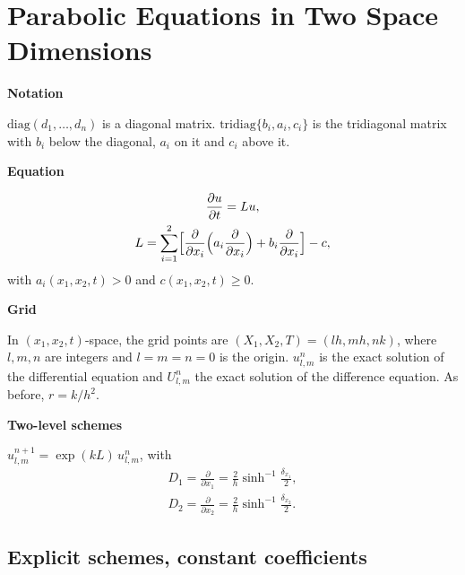 \documentclass[11pt,a4paper]{article}
\numberwithin{equation}{section}
\theoremstyle{spacedplain}
\theoremstyle{spaceddefinition}
\theoremstyle{spacedremark}
\newcommand{\step}[1]{\par\addvspace{0.6em}\noindent\textbf{#1}\par\nobreak}
\newcommand{\pd}[2]{\frac{\partial #1}{\partial #2}}
\begin{document}
\section{Parabolic Equations in Two Space Dimensions}

\step{Notation}
\(\mathrm{diag}(d_1,\dots,d_n)\) is a diagonal
matrix.  \(\mathrm{tridiag}\{b_i,a_i,c_i\}\) is the tridiagonal matrix
with \(b_i\) below the diagonal, \(a_i\) on it and \(c_i\) above it.

\step{Equation}

\[
\begin{gathered}
  \pd ut=Lu,
  \\
  L=\sum_{i=1}^2\Bigl[\pd{}{x_i}\Bigl(a_i\pd{}{x_i}\Bigr)+b_i\pd{}{x_i}\Bigr]-c,
\end{gathered}
\]
with \(a_i(x_1,x_2,t)>0\) and \(c(x_1,x_2,t)\ge0\).

\step{Grid}
In \((x_1,x_2,t)\)-space, the grid points are
\((X_1,X_2,T)=(lh,mh,nk)\), where \(l,m,n\) are integers and
\(l=m=n=0\) is the origin.  \(u_{l,m}^n\) is the exact solution of the
differential equation and \(U_{l,m}^n\) the exact solution of the
difference equation.  As before, \(r=k/h^2\).

\step{Two-level schemes}
\(u_{l,m}^{n+1}=\exp(kL)\,u_{l,m}^n\), with
\[
\begin{gathered}
  D_1=\pd{}{x_1}=\frac2h\sinh^{-1}\frac{\delta_{x_1}}2,
  \\
  D_2=\pd{}{x_2}=\frac2h\sinh^{-1}\frac{\delta_{x_2}}2.
\end{gathered}
\]

\subsection{Explicit schemes, constant coefficients}
\end{document}
